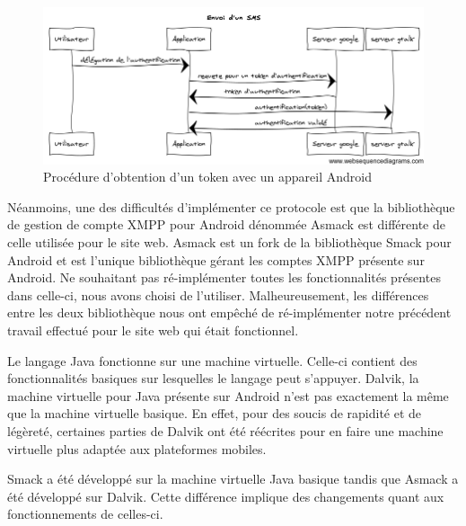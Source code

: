  

\begin{figure}[!h]
  \center
  \includegraphics[width=15cm]{img/obtention-token-avec-android.png}
  \caption{Procédure d'obtention d'un token avec un appareil Android}
  \label{obtention-token-avec-android}
\end{figure}

Néanmoins, une des difficultés d'implémenter ce protocole est que la bibliothèque de gestion de compte
XMPP pour Android dénommée Asmack est différente de celle utilisée pour le site web. Asmack est un fork 
de la bibliothèque Smack pour Android et est l'unique bibliothèque gérant les comptes XMPP présente sur
Android. Ne souhaitant pas ré-implémenter toutes les fonctionnalités présentes dans celle-ci, nous avons
choisi de l'utiliser. Malheureusement, les différences entre les deux bibliothèque nous ont empêché de 
ré-implémenter notre précédent travail effectué pour le site web qui était fonctionnel. 

Le langage Java fonctionne sur une machine virtuelle. Celle-ci contient des fonctionnalités basiques sur
lesquelles le langage peut s'appuyer. Dalvik, la machine virtuelle pour Java présente sur Android n'est 
pas exactement la même que la machine virtuelle basique. En effet, pour des soucis de rapidité et de 
légèreté, certaines parties de Dalvik ont été réécrites pour en faire une machine virtuelle plus adaptée
aux plateformes mobiles.

Smack a été développé sur la machine virtuelle Java basique tandis que Asmack a été développé sur Dalvik.
Cette différence implique des changements quant aux fonctionnements de celles-ci.

